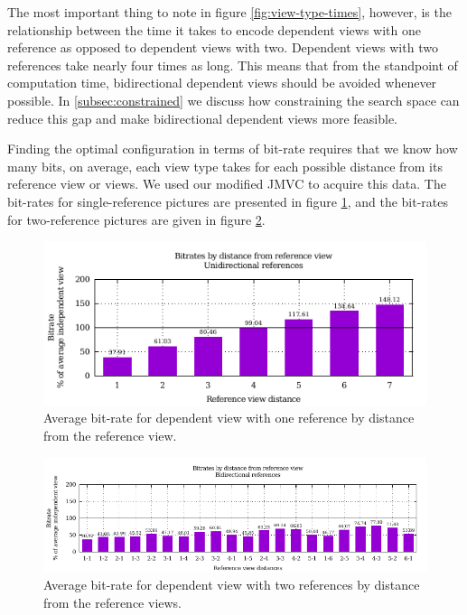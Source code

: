 \documentclass{sig-alternate-05-2015}
\begin{document}
The most important thing to note in figure \ref{fig:view-type-times}, however,
is the relationship between the time it takes to encode dependent views with one
reference as opposed to dependent views with two. Dependent views with two
references take nearly four times as long. This means that from the standpoint
of computation time, bidirectional dependent views should be avoided whenever
possible. In \ref{subsec:constrained} we discuss how constraining the search
space can reduce this gap and make bidirectional dependent views more feasible.

Finding the optimal configuration in terms of bit-rate requires that we know how
many bits, on average, each view type takes for each possible distance from its
reference view or views. We used our modified JMVC to acquire this data. The
bit-rates for single-reference pictures are presented in figure
\ref{fig:uniframes}, and the bit-rates for two-reference pictures are given in
figure \ref{fig:biframes}.

\begin{figure}
\centering
\includegraphics[scale=.68]{figures/motion_vector_data_unconstrained_unidirectional.pdf}
\caption{Average bit-rate for dependent view with one reference by distance
from the reference view.}
\label{fig:uniframes}
\end{figure}

\begin{figure}
\centering
\includegraphics[scale=.68]{figures/motion_vector_data_unconstrained_bidirectional.pdf}
\caption{Average bit-rate for dependent view with two references by distance
from the reference views.}
\label{fig:biframes}
\end{figure}
\end{document}
